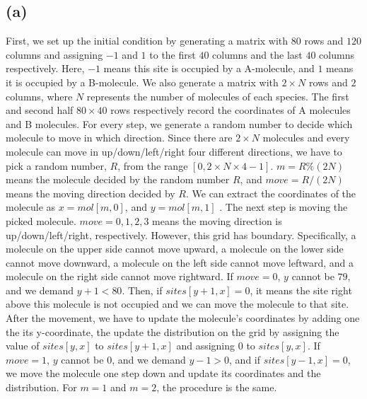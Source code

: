 \documentclass{article}
\begin{document}
\subsection{(a)}
First, we set up the initial condition by generating a matrix with $80$ rows
and $120$ columns and assigning $-1$ and $1$ to the first $40$ columns and
the last $40$ columns respectively. Here, $-1$ means this site is occupied
by a A-molecule, and $1$ means it is occupied by a B-molecule. We also
generate a matrix with $2\times N$ rows and $2$ columns, where $N$
represents the number of molecules of each species. The first and second
half $80\times 40$ rows respectively record the coordinates of A molecules
and B molecules. For every step, we generate a random number to decide which
molecule to move in which direction. Since there are $2\times N$ molecules
and every molecule can move in up/down/left/right four different directions,
we have to pick a random number, $R$, from the range $\left[ 0,2\times
N\times 4-1\right] $. $m=R\%(2N)$ means the molecule decided by the random
number $R$, and $move=R/(2N)$ means the moving direction decided by $R$. We
can extract the coordinates of the molecule as $x=mol[m,0]$, and $y=mol[m,1]$%
. The next step is moving the picked molecule. $move=0,1,2,3$ means the
moving direction is up/down/left/right, respectively. However, this grid has
boundary. Specifically, a molecule on the upper side cannot move upward, a
molecule on the lower side cannot move downward, a molecule on the left side
cannot move leftward, and a molecule on the right side cannot move
rightward. If $move=0$, $y$ cannot be $79$, and we demand $y+1<80$. Then, if
$sites[y+1,x]=0$, it means the site right above this molecule is not
occupied and we can move the molecule to that site. After the movement, we
have to update the molecule's coordinates by adding one the its
y-coordinate, the update the distribution on the grid by assigning the value
of $sites[y,x]$ to $sites[y+1,x]$ and assigning $0$ to $sites[y,x]$. If $%
move=1$, $y$ cannot be $0$, and we demand $y-1>0$, and if $sites[y-1,x]=0$,
we move the molecule one step down and update its coordinates and the
distribution. For $m=1$ and $m=2$, the procedure is the same.
\end{document}
